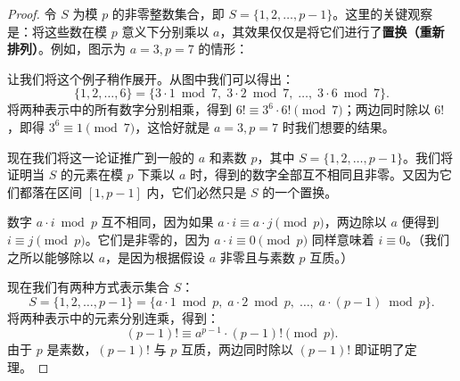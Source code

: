 \begin{proof}
令 $S$ 为模 $p$ 的非零整数集合，即 $S = \{1, 2, \dots, p-1\}$。这里的关键观察是：将这些数在模 $p$ 意义下分别乘以 $a$，其效果仅仅是将它们进行了\textbf{置换（重新排列）}。例如，图示为 $a = 3, p = 7$ 的情形：
\begin{center}
\end{center}

让我们将这个例子稍作展开。从图中我们可以得出：
\[
\{1, 2, \dots, 6\} = \{3 \cdot 1 \bmod 7,\; 3 \cdot 2 \bmod 7,\; \dots,\; 3 \cdot 6 \bmod 7\}.
\]
将两种表示中的所有数字分别相乘，得到 $6! \equiv 3^6 \cdot 6! \pmod 7$；两边同时除以 $6!$，即得 $3^6 \equiv 1 \pmod 7$，这恰好就是 $a = 3, p = 7$ 时我们想要的结果。

现在我们将这一论证推广到一般的 $a$ 和素数 $p$，其中 $S = \{1, 2, \dots, p-1\}$。我们将证明当 $S$ 的元素在模 $p$ 下乘以 $a$ 时，得到的数字全部互不相同且非零。又因为它们都落在区间 $[1, p-1]$ 内，它们必然只是 $S$ 的一个置换。

数字 $a \cdot i \bmod p$ 互不相同，因为如果 $a \cdot i \equiv a \cdot j \pmod p$，两边除以 $a$ 便得到 $i \equiv j \pmod p$。它们是非零的，因为 $a \cdot i \equiv 0 \pmod p$ 同样意味着 $i \equiv 0$。（我们之所以能够除以 $a$，是因为根据假设 $a$ 非零且与素数 $p$ 互质。）

现在我们有两种方式表示集合 $S$：
\[
S = \{1, 2, \dots, p-1\} = \{a \cdot 1 \bmod p,\; a \cdot 2 \bmod p,\; \dots,\; a \cdot (p-1) \bmod p\}.
\]
将两种表示中的元素分别连乘，得到：
\[
(p-1)! \equiv a^{p-1} \cdot (p-1)! \pmod p.
\]
由于 $p$ 是素数，$(p-1)!$ 与 $p$ 互质，两边同时除以 $(p-1)!$ 即证明了定理。
\end{proof}

